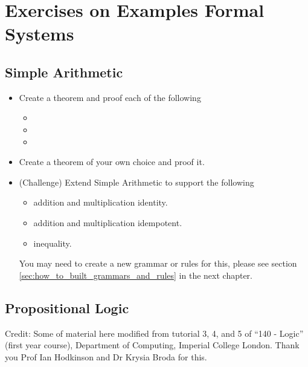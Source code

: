 \documentclass[master.tex]{subfiles}
\begin{document}
\chapter{Exercises on Examples Formal Systems}
\label{chap:excercises}

\section{Simple Arithmetic}

\begin{itemize}
\item Create a theorem and proof each of the following
  \begin{itemize}
  \item {}
  \item {}
  \item {}
  \end{itemize}
\item Create a theorem of your own choice and proof it.
\item (Challenge) Extend Simple Arithmetic to support the following
  \begin{itemize}
  \item addition and multiplication identity.
  \item addition and multiplication idempotent.
  \item inequality.
  \end{itemize}
  You may need to create a new grammar or rules for this, please see section
  \ref{sec:how_to_built_grammars_and_rules} in the next chapter.
\end{itemize}

\section{Propositional Logic}

Credit: Some of material here modified from tutorial 3, 4, and 5 of ``140 -
Logic'' (first year course), Department of Computing, Imperial College London.
Thank you Prof Ian Hodkinson and Dr Krysia Broda for this.
\end{document}
